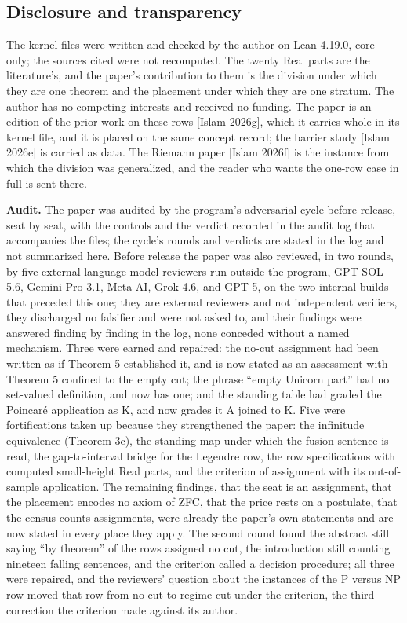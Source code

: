 \documentclass[10pt]{article}
\begin{document}
\hypertarget{disclosure-and-transparency}{%
\subsection{Disclosure and
transparency}\label{disclosure-and-transparency}}

The kernel files were written and checked by the author on Lean 4.19.0,
core only; the sources cited were not recomputed. The twenty Real parts
are the literature's, and the paper's contribution to them is the
division under which they are one theorem and the placement under which
they are one stratum. The author has no competing interests and received
no funding. The paper is an edition of the prior work on these rows
{[}Islam 2026g{]}, which it carries whole in its kernel file, and it is
placed on the same concept record; the barrier study {[}Islam 2026e{]}
is carried as data. The Riemann paper {[}Islam 2026f{]} is the instance
from which the division was generalized, and the reader who wants the
one-row case in full is sent there.

\textbf{Audit.} The paper was audited by the program's adversarial cycle
before release, seat by seat, with the controls and the verdict recorded
in the audit log that accompanies the files; the cycle's rounds and
verdicts are stated in the log and not summarized here. Before release
the paper was also reviewed, in two rounds, by five external
language-model reviewers run outside the program, GPT SOL 5.6, Gemini
Pro 3.1, Meta AI, Grok 4.6, and GPT 5, on the two internal builds that
preceded this one; they are external reviewers and not independent
verifiers, they discharged no falsifier and were not asked to, and their
findings were answered finding by finding in the log, none conceded
without a named mechanism. Three were earned and repaired: the no-cut
assignment had been written as if Theorem 5 established it, and is now
stated as an assessment with Theorem 5 confined to the empty cut; the
phrase ``empty Unicorn part'' had no set-valued definition, and now has
one; and the standing table had graded the Poincaré application as K,
and now grades it A joined to K. Five were fortifications taken up
because they strengthened the paper: the infinitude equivalence (Theorem
3c), the standing map under which the fusion sentence is read, the
gap-to-interval bridge for the Legendre row, the row specifications with
computed small-height Real parts, and the criterion of assignment with
its out-of-sample application. The remaining findings, that the seat is
an assignment, that the placement encodes no axiom of ZFC, that the
price rests on a postulate, that the census counts assignments, were
already the paper's own statements and are now stated in every place
they apply. The second round found the abstract still saying ``by
theorem'' of the rows assigned no cut, the introduction still counting
nineteen falling sentences, and the criterion called a decision
procedure; all three were repaired, and the reviewers' question about
the instances of the P versus NP row moved that row from no-cut to
regime-cut under the criterion, the third correction the criterion made
against its author.
\end{document}
